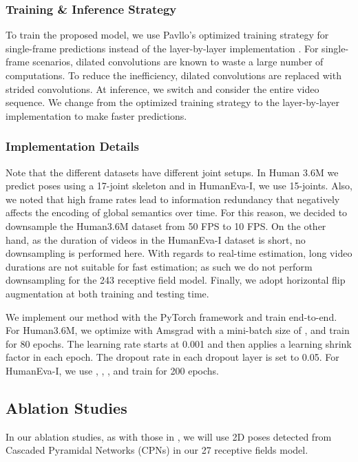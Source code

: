 \documentclass[letterpaper, 10 pt, conference, twoside]{ieeeconf}
\begin{document}
\subsubsection{Training \& Inference Strategy}
To train the proposed model, we use Pavllo's optimized training strategy for single-frame predictions instead of the layer-by-layer implementation \cite{pavllo20193d}.
For single-frame scenarios, dilated convolutions are known to waste a large number of computations. To reduce the inefficiency, dilated convolutions are replaced with strided convolutions. At inference, we switch and consider the entire video sequence. We change from the optimized training strategy to the layer-by-layer implementation to make faster predictions. 


\subsubsection{Implementation Details}
Note that the different datasets have different joint setups. In Human 3.6M we predict poses using a 17-joint skeleton and in HumanEva-I, we use 15-joints. Also, we noted that high frame rates lead to information redundancy that negatively affects the encoding of global semantics over time. For this reason, we decided to downsample the Human3.6M dataset from 50 FPS to 10 FPS. On the other hand, as the duration of videos in the HumanEva-I dataset is short, no downsampling is performed here. With regards to real-time estimation, long video durations are not suitable for fast estimation; as such we do not perform downsampling for the 243 receptive field model. Finally, we adopt horizontal flip augmentation at both training and testing time.

We implement our method with the PyTorch framework and train end-to-end. For Human3.6M, we optimize with Amsgrad with a mini-batch size of , and train for 80 epochs. The learning rate starts at 0.001 and then applies a learning shrink factor  in each epoch. The dropout rate  in each dropout layer is set to 0.05. For HumanEva-I, we use , , , and train for 200 epochs.
\subsection{Ablation Studies}
In our ablation studies, as with those in \cite{cai2019exploiting, pavllo20193d}, we will use 2D poses detected from Cascaded Pyramidal Networks (CPNs) \cite{chen2018cascaded} in our 27 receptive fields model.
\end{document}
